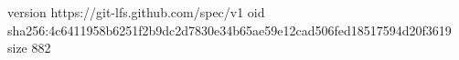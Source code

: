 version https://git-lfs.github.com/spec/v1
oid sha256:4c6411958b6251f2b9dc2d7830e34b65ae59e12cad506fed18517594d20f3619
size 882
